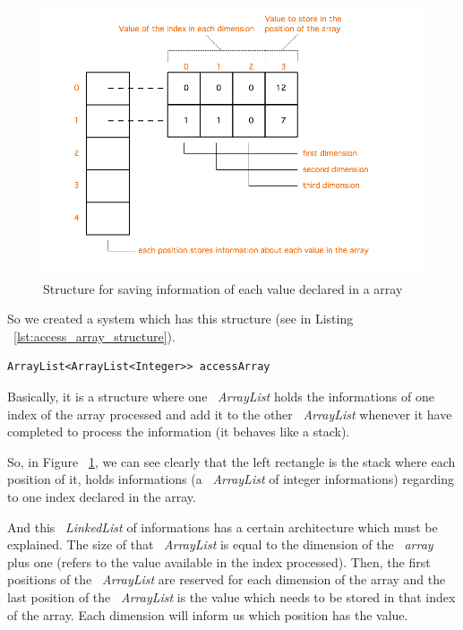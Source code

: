\documentclass[
  oneside,
  11pt, a4paper,
  footinclude=true,
  headinclude=true,
  cleardoublepage=empty
]{scrbook}
\begin{document}
\begin{figure}[h!]
  \centering
    \includegraphics[width=1\textwidth]{img/access_array.png}
    \caption{Structure for saving information of each value declared in a array}
    \label{fig:access_array_structure}
\end{figure}

So we created a system which has this structure (see in Listing ~\ref{lst:access_array_structure}).

\begin{lstlisting}[caption={Structure of saving informations of each index in JAVA},label={lst:access_array_structure}]
  ArrayList<ArrayList<Integer>> accessArray
\end{lstlisting}

Basically, it is a structure where one ~\textit{ArrayList} holds the informations of one index of the array processed and add it to the other ~\textit{ArrayList} whenever it have completed to process the information (it behaves like a stack).

So, in Figure ~\ref{fig:access_array_structure}, we can see clearly that the left rectangle is the stack where each position of it, holds informations (a ~\textit{ArrayList} of integer informations) regarding to one index declared in the array.

And this ~\textit{LinkedList} of informations has a certain architecture which must be explained.
The size of that ~\textit{ArrayList} is equal to the dimension of the ~\textit{array} plus one (refers to the value available in the index processed). Then, the first positions of the ~\textit{ArrayList} are reserved for each dimension of the array and the last position of the ~\textit{ArrayList} is the value which needs to be stored in that index of the array.
Each dimension will inform us which position has the value.
\end{document}
